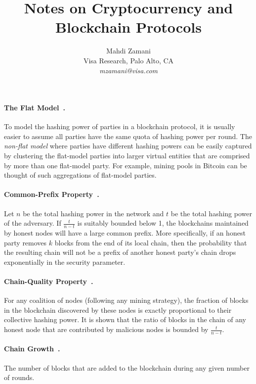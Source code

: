 \documentclass[11pt]{article}
\theoremstyle{mytheoremstyle}
\begin{document}
\title{Notes on Cryptocurrency and Blockchain Protocols}

\author{Mahdi Zamani\\ Visa Research, Palo Alto, CA \\ \textit{mzamani@visa.com}}
\date{}

\maketitle

\paragraph{The Flat Model~\cite{garaybitcoin2015}.} To model the hashing power of parties in a blockchain protocol, it is usually easier to assume all parties have the same quota of hashing power per round. The \emph{non-flat model} where parties have different hashing powers can be easily captured by clustering the flat-model parties into larger virtual entities that are comprised by more than one flat-model party. For example, mining pools in Bitcoin can be thought of such aggregations of flat-model parties.

\paragraph{Common-Prefix Property~\cite{garaybitcoin2015}.} Let $n$ be the total hashing power in the network and $t$ be the total hashing power of the adversary. If $\frac{t}{n-t}$ is suitably bounded below 1, the blockchains maintained by honest nodes will have a large common prefix. More specifically, if an honest party removes $k$ blocks from the end of its local chain, then the probability that the resulting chain will not be a prefix of another honest party's chain drops exponentially in the security parameter. 

\paragraph{Chain-Quality Property~\cite{garaybitcoin2015}.} For any coalition of nodes (following any mining strategy), the fraction of blocks in the blockchain discovered by these nodes is exactly proportional to their collective hashing power. It is shown that the ratio of blocks in the chain of any honest node that are contributed by malicious nodes is bounded by $\frac{t}{n-t}$.

\paragraph{Chain Growth~\cite{cryptoeprint:2016:545}.} The number of blocks that are added to the blockchain during any given number of rounds.
\end{document}
